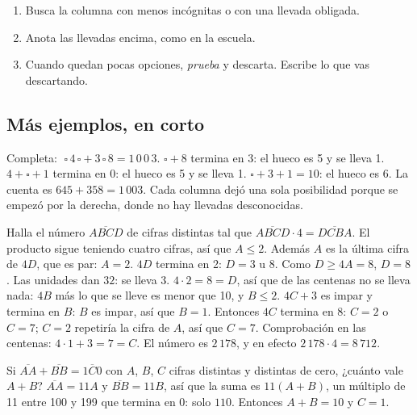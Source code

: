 \begin{regla}[Estrategia]
\begin{enumerate}
  \item Busca la columna con menos incógnitas o con una llevada obligada.
  \item Anota las llevadas encima, como en la escuela.
  \item Cuando quedan pocas opciones, \emph{prueba} y descarta. Escribe lo que vas descartando.
\end{enumerate}
\end{regla}

\subsection{Más ejemplos, en corto}
\begin{ejemplo}
Completa: $\;\square\,4\,\square + 3\,\square\,8 = 1\,0\,0\,3$.
\solucion {} $\square + 8$ termina en 3: el hueco es 5 y se lleva 1.
 $4 + \square + 1$ termina en 0: el hueco es 5 y se lleva 1.
 $\square + 3 + 1 = 10$: el hueco es 6.
La cuenta es $645 + 358 = 1\,003$. Cada columna dejó una sola posibilidad porque se empezó por la derecha, donde no hay
llevadas desconocidas.
\end{ejemplo}

\begin{ejemplo}
Halla el número $\overline{ABCD}$ de cifras distintas tal que $\overline{ABCD} \cdot 4 = \overline{DCBA}$.
\solucion
{} El producto sigue teniendo cuatro cifras, así que $A \le 2$. Además $A$ es la última cifra de
$4D$, que es par: $A = 2$.
 $4D$ termina en 2: $D = 3$ u $8$. Como $D \ge 4A = 8$, $D = 8$. Las unidades dan $32$: se lleva 3.
 $4 \cdot 2 = 8 = D$, así que de las centenas no se lleva nada: $4B$ más lo que se lleve es menor
que 10, y $B \le 2$.
 $4C + 3$ es impar y termina en $B$: $B$ es impar, así que $B = 1$. Entonces $4C$ termina en 8:
$C = 2$ o $C = 7$; $C = 2$ repetiría la cifra de $A$, así que $C = 7$. Comprobación en las centenas: $4 \cdot 1 + 3 = 7 = C$.
El número es $2\,178$, y en efecto $2\,178 \cdot 4 = 8\,712$.
\end{ejemplo}

\begin{ejemplo}
Si $\overline{AA} + \overline{BB} = \overline{1C0}$ con $A$, $B$, $C$ cifras distintas y distintas de cero, ¿cuánto
vale $A + B$?
\solucion $\overline{AA} = 11A$ y $\overline{BB} = 11B$, así que la suma es $11(A + B)$, un múltiplo de 11 entre 100
y 199 que termina en 0: solo $110$. Entonces $A + B = 10$ y $C = 1$.
\end{ejemplo}

